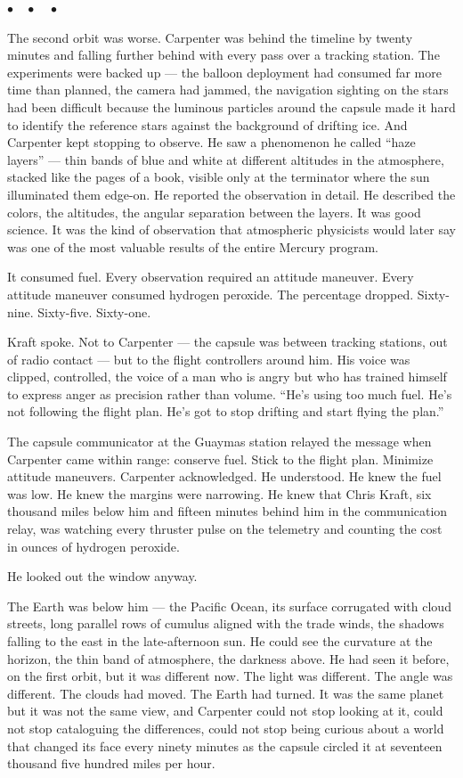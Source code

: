 \documentclass[12pt, letterpaper]{article}
\begin{document}
\begin{center}
$\bullet\quad\bullet\quad\bullet$
\end{center}

The second orbit was worse. Carpenter was behind the timeline by twenty minutes and falling further behind with every pass over a tracking station. The experiments were backed up --- the balloon deployment had consumed far more time than planned, the camera had jammed, the navigation sighting on the stars had been difficult because the luminous particles around the capsule made it hard to identify the reference stars against the background of drifting ice. And Carpenter kept stopping to observe. He saw a phenomenon he called ``haze layers'' --- thin bands of blue and white at different altitudes in the atmosphere, stacked like the pages of a book, visible only at the terminator where the sun illuminated them edge-on. He reported the observation in detail. He described the colors, the altitudes, the angular separation between the layers. It was good science. It was the kind of observation that atmospheric physicists would later say was one of the most valuable results of the entire Mercury program.

It consumed fuel. Every observation required an attitude maneuver. Every attitude maneuver consumed hydrogen peroxide. The percentage dropped. Sixty-nine. Sixty-five. Sixty-one.

Kraft spoke. Not to Carpenter --- the capsule was between tracking stations, out of radio contact --- but to the flight controllers around him. His voice was clipped, controlled, the voice of a man who is angry but who has trained himself to express anger as precision rather than volume. ``He's using too much fuel. He's not following the flight plan. He's got to stop drifting and start flying the plan.''

The capsule communicator at the Guaymas station relayed the message when Carpenter came within range: conserve fuel. Stick to the flight plan. Minimize attitude maneuvers. Carpenter acknowledged. He understood. He knew the fuel was low. He knew the margins were narrowing. He knew that Chris Kraft, six thousand miles below him and fifteen minutes behind him in the communication relay, was watching every thruster pulse on the telemetry and counting the cost in ounces of hydrogen peroxide.

He looked out the window anyway.

The Earth was below him --- the Pacific Ocean, its surface corrugated with cloud streets, long parallel rows of cumulus aligned with the trade winds, the shadows falling to the east in the late-afternoon sun. He could see the curvature at the horizon, the thin band of atmosphere, the darkness above. He had seen it before, on the first orbit, but it was different now. The light was different. The angle was different. The clouds had moved. The Earth had turned. It was the same planet but it was not the same view, and Carpenter could not stop looking at it, could not stop cataloguing the differences, could not stop being curious about a world that changed its face every ninety minutes as the capsule circled it at seventeen thousand five hundred miles per hour.
\end{document}
